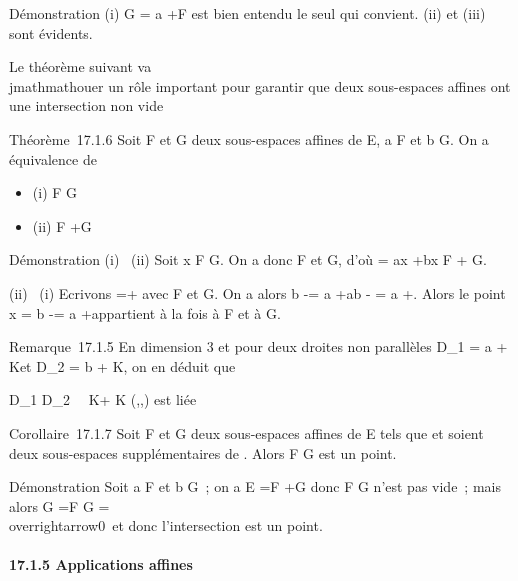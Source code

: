 \documentclass[]{article}
\begin{document}
Démonstration (i) G = a +\overrightarrow F est bien
entendu le seul qui convient. (ii) et (iii) sont évidents.

Le théorème suivant va \\jmathmathouer un rôle important pour garantir que deux
sous-espaces affines ont une intersection non vide

Théorème~17.1.6 Soit F et G deux sous-espaces affines de E, a \in F et b \in
G. On a équivalence de

\begin{itemize}
\itemsep1pt\parskip0pt
\item
  (i) F \bigcap G\neq~\varnothing~
\item
  (ii) \overrightarrowab
  \in\overrightarrow F
  +\overrightarrow G
\end{itemize}

Démonstration (i) \rigtharrow~(ii) Soit x \in F \bigcap G. On a donc
\overrightarrowax \in\overrightarrow
F et \overrightarrowxb
\in\overrightarrow G, d'où
\overrightarrowab =\overrightarrow
ax +\overrightarrow bx
\in\overrightarrow F +\overrightarrow
G.

(ii) \rigtharrow~(i) Ecrivons \overrightarrowab
=\overrightarrow \xi +\overrightarrow
\eta avec \overrightarrow\xi
\in\overrightarrow F et
\overrightarrow\eta \in\overrightarrow
G. On a alors b -\overrightarrow \eta = a
+\overrightarrow ab -\overrightarrow
\eta = a +\overrightarrow \xi. Alors le point x = b
-\overrightarrow \eta = a
+\overrightarrow \xi appartient à la fois à F et à G.

Remarque~17.1.5 En dimension 3 et pour deux droites non parallèles
D_1 = a + K\vecu et D_2 = b +
K\vecv, on en déduit que

D_1 \bigcap
D_2\neq~\varnothing~\mathrel\Leftrightarrow
\overrightarrowab \in K\vecu +
K\vecv \Leftrightarrow
(\overrightarrowab,\vecu,\vecv)\text
est liée 

Corollaire~17.1.7 Soit F et G deux sous-espaces affines de E tels que
\overrightarrowF et
\overrightarrowG soient deux sous-espaces
supplémentaires de \overrightarrowE. Alors F \bigcap G est
un point.

Démonstration Soit a \in F et b \in G~; on a
\overrightarrowab \in\overrightarrow
E =\overrightarrow F
+\overrightarrow G donc F \bigcap G n'est pas vide~; mais
alors \overrightarrowF \bigcap G
=\overrightarrow F \bigcap\overrightarrow
G =
\\overrightarrow0\
et donc l'intersection est un point.

\paragraph{17.1.5 Applications affines}
\end{document}
